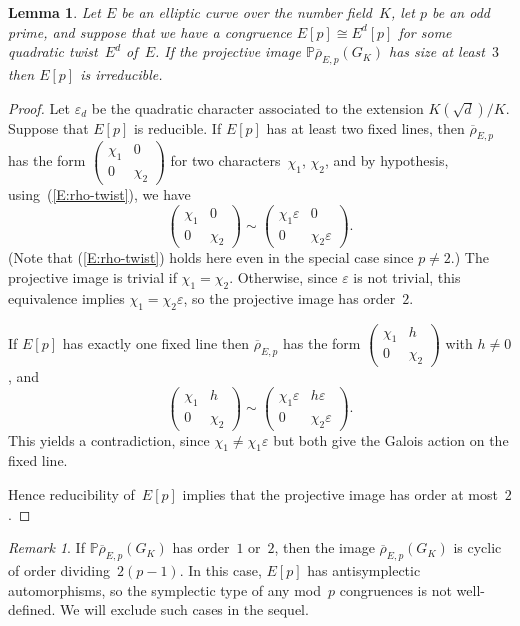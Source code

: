 \documentclass[12pt, reqno]{amsart}
\newcommand{\PP}{\mathbb{P}}
\newcommand{\rhobar}{{\overline{\rho}}}
\newcommand{\eps}{\varepsilon}
\numberwithin{equation}{section}
\newtheorem{lemma}[theorem]{Lemma}
\theoremstyle{definition}
\theoremstyle{remark}
\newtheorem{remark}[theorem]{Remark}
\begin{document}
\begin{lemma}\label{L:irred}
Let $E$ be an elliptic curve over the number field~$K$, let $p$ be an
odd prime, and suppose that we have a congruence $E[p]\cong E^d[p]$
for some quadratic twist~$E^d$ of~$E$.  If the projective image $\PP
\rhobar_{E,p} (G_K)$ has size at least~$3$ then $E[p]$ is irreducible.
\end{lemma}
\begin{proof}
Let $\eps_d$ be the quadratic character associated to the extension
$K(\sqrt{d})/K$.  Suppose that $E[p]$ is reducible.  If $E[p]$ has at
least two fixed lines, then $\rhobar_{E,p}$ has the form
\(
\begin{pmatrix}\chi_1&0\\0&\chi_2
\end{pmatrix}
\) for two characters~$\chi_1$, $\chi_2$, and by hypothesis,
using~(\ref{E:rho-twist}), we have
\[
\begin{pmatrix}\chi_1&0\\0&\chi_2
\end{pmatrix}
\sim
\begin{pmatrix}\chi_1\eps&0\\0&\chi_2\eps
\end{pmatrix}.
\]
(Note that (\ref{E:rho-twist}) holds here even in the special case
since $p\not=2$.)  The projective image is trivial if $\chi_1=\chi_2$.
Otherwise, since $\eps$ is not trivial, this equivalence implies
$\chi_1=\chi_2\eps$, so the projective image has order~$2$.

If $E[p]$ has exactly one fixed line then
$\rhobar_{E,p}$ has the form
\(
\begin{pmatrix}\chi_1&h\\0&\chi_2
\end{pmatrix}
\)
with $h\not=0$, and
\[
\begin{pmatrix}\chi_1&h\\0&\chi_2
\end{pmatrix}
\sim
\begin{pmatrix}\chi_1\eps&h\eps\\0&\chi_2\eps
\end{pmatrix}.
\]
This yields a contradiction, since $\chi_1\not=\chi_1\eps$ but both
give the Galois action on the fixed line.

Hence reducibility of~$E[p]$ implies that the projective image has
order at most~$2$.
\end{proof}

\begin{remark}
If $\PP\rhobar_{E,p} (G_K)$ has order~$1$ or~$2$, then the image
$\rhobar_{E,p} (G_K)$ is cyclic of order dividing~$2(p-1)$.  In this
case, $E[p]$ has antisymplectic automorphisms, so the symplectic type
of any mod~$p$ congruences is not well-defined.  We will exclude such
cases in the sequel.
\end{remark}
\end{document}
